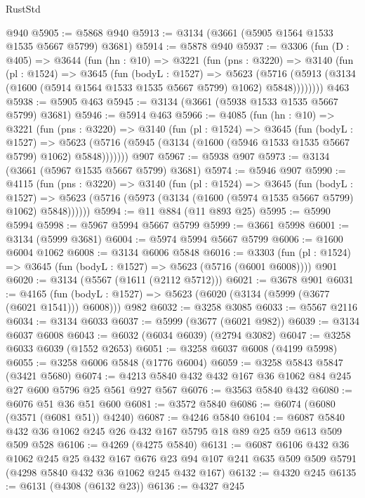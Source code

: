 \begin{lexlean}{RustStd}
\begin{coremodule}
    @940
@5905 := @5868 @940
@5913 := @3134 (@3661 (@5905 @1564 @1533 @1535 @5667 @5799) @3681)
@5914 := @5878 @940
@5937 := @3306
    (fun (D : @405) =>
    @3644
      (fun (hn : @10) =>
      @3221
        (fun (pns : @3220) =>
        @3140
          (fun (pl : @1524) =>
          @3645
            (fun (bodyL : @1527) =>
            @5623
              (@5716 (@5913 (@3134 (@1600 (@5914 @1564 @1533 @1535 @5667 @5799) @1062) @5848))))))))
    @463
@5938 := @5905 @463
@5945 := @3134 (@3661 (@5938 @1533 @1535 @5667 @5799) @3681)
@5946 := @5914 @463
@5966 := @4085
    (fun (hn : @10) =>
    @3221
      (fun (pns : @3220) =>
      @3140
        (fun (pl : @1524) =>
        @3645
          (fun (bodyL : @1527) =>
          @5623 (@5716 (@5945 (@3134 (@1600 (@5946 @1533 @1535 @5667 @5799) @1062) @5848)))))))
    @907
@5967 := @5938 @907
@5973 := @3134 (@3661 (@5967 @1535 @5667 @5799) @3681)
@5974 := @5946 @907
@5990 := @4115
    (fun (pns : @3220) =>
    @3140
      (fun (pl : @1524) =>
      @3645
        (fun (bodyL : @1527) =>
        @5623 (@5716 (@5973 (@3134 (@1600 (@5974 @1535 @5667 @5799) @1062) @5848))))))
@5994 := @11 @884 (@11 @893 @25)
@5995 := @5990 @5994
@5998 := @5967 @5994 @5667 @5799
@5999 := @3661 @5998
@6001 := @3134 (@5999 @3681)
@6004 := @5974 @5994 @5667 @5799
@6006 := @1600 @6004 @1062
@6008 := @3134 @6006 @5848
@6016 := @3303 (fun (pl : @1524) => @3645 (fun (bodyL : @1527) => @5623 (@5716 (@6001 @6008)))) @901
@6020 := @3134 (@5567 (@1611 (@2112 @5712)))
@6021 := @3678 @901
@6031 := @4165
    (fun (bodyL : @1527) => @5623 (@6020 (@3134 (@5999 (@3677 (@6021 @1541))) @6008)))
    @982
@6032 := @3258 @3085
@6033 := @5567 @2116
@6034 := @3134 @6033
@6037 := @5999 (@3677 (@6021 @982))
@6039 := @3134 @6037 @6008
@6043 := @6032 (@6034 @6039) (@2794 @3082)
@6047 := @3258 @6033 @6039 (@1552 @2653)
@6051 := @3258 @6037 @6008 (@4199 @5998)
@6055 := @3258 @6006 @5848 (@1776 @6004)
@6059 := @3258 @5843 @5847 (@3421 @5680)
@6074 := @4213 @5840 @432 @432 @167 @36 @1062 @84 @245 @27 @600 @5796 @25 @561 @927 @567
@6076 := @3563 @5840 @432
@6080 := @6076 @51 @36 @51 @600
@6081 := @3572 @5840
@6086 := @6074 (@6080 (@3571 (@6081 @51)) @4240)
@6087 := @4246 @5840
@6104 := @6087 @5840 @432 @36 @1062 @245 @26 @432 @167 @5795 @18 @89 @25 @59 @613 @509 @509 @528
@6106 := @4269 (@4275 @5840)
@6131 := @6087
    @6106
    @432
    @36
    @1062
    @245
    @25
    @432
    @167
    @676
    @23
    @94
    @107
    @241
    @635
    @509
    @509
    @5791
    (@4298 @5840 @432 @36 @1062 @245 @432 @167)
@6132 := @4320 @245
@6135 := @6131 (@4308 (@6132 @23))
@6136 := @4327 @245

\end{coremodule}
\end{lexlean}
